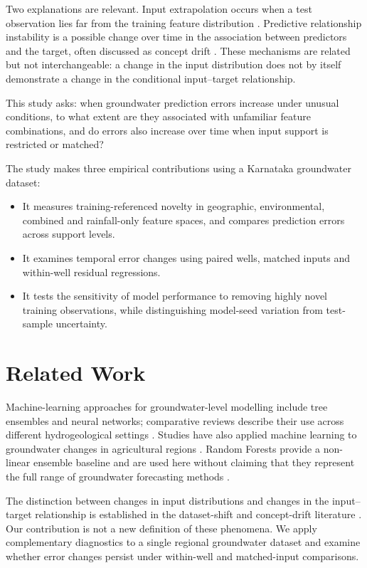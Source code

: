 \documentclass[conference]{IEEEtran}
\begin{document}
Two explanations are relevant. Input extrapolation occurs when a test observation lies far from the training feature distribution \cite{datasetshift}. Predictive relationship instability is a possible change over time in the association between predictors and the target, often discussed as concept drift \cite{gama}. These mechanisms are related but not interchangeable: a change in the input distribution does not by itself demonstrate a change in the conditional input--target relationship.

This study asks: when groundwater prediction errors increase under unusual conditions, to what extent are they associated with unfamiliar feature combinations, and do errors also increase over time when input support is restricted or matched?

The study makes three empirical contributions using a Karnataka groundwater dataset:
\begin{itemize}
\item It measures training-referenced novelty in geographic, environmental, combined and rainfall-only feature spaces, and compares prediction errors across support levels.
\item It examines temporal error changes using paired wells, matched inputs and within-well residual regressions.
\item It tests the sensitivity of model performance to removing highly novel training observations, while distinguishing model-seed variation from test-sample uncertainty.
\end{itemize}

\section{Related Work}
Machine-learning approaches for groundwater-level modelling include tree ensembles and neural networks; comparative reviews describe their use across different hydrogeological settings \cite{rajaee,wunsch}. Studies have also applied machine learning to groundwater changes in agricultural regions \cite{sahoo}. Random Forests provide a non-linear ensemble baseline and are used here without claiming that they represent the full range of groundwater forecasting methods \cite{breiman}.

The distinction between changes in input distributions and changes in the input--target relationship is established in the dataset-shift and concept-drift literature \cite{datasetshift,gama}. Our contribution is not a new definition of these phenomena. We apply complementary diagnostics to a single regional groundwater dataset and examine whether error changes persist under within-well and matched-input comparisons.
\end{document}
